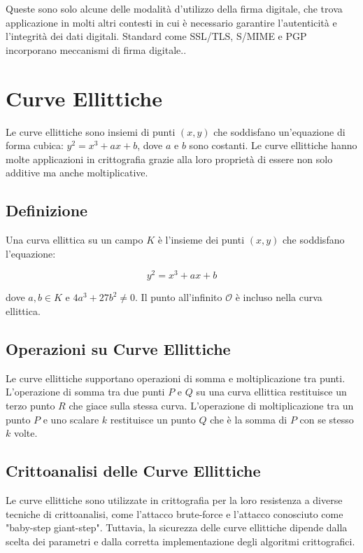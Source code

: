 \documentclass[a4paper,12pt]{report}
\begin{document}
Queste sono solo alcune delle modalità d'utilizzo della firma digitale, che trova applicazione in molti altri contesti in cui è necessario garantire l'autenticità e l'integrità dei dati digitali. Standard come SSL/TLS, S/MIME e PGP incorporano meccanismi di firma digitale..
%
%
%
%
%
%
%
%
%
%
%
%
\chapter{Curve Ellittiche}
Le curve ellittiche sono insiemi di punti $(x, y)$ che soddisfano un'equazione di forma cubica: $y^2 = x^3 + ax + b$, dove $a$ e $b$ sono costanti. Le curve ellittiche hanno molte applicazioni in crittografia grazie alla loro proprietà di essere non solo additive ma anche moltiplicative.

\section{Definizione}

Una curva ellittica su un campo $K$ è l'insieme dei punti $(x, y)$ che soddisfano l'equazione:

\[y^2 = x^3 + ax + b\]

dove $a, b \in K$ e $4a^3 + 27b^2 \neq 0$. Il punto all'infinito $\mathcal{O}$ è incluso nella curva ellittica.

\section{Operazioni su Curve Ellittiche}

Le curve ellittiche supportano operazioni di somma e moltiplicazione tra punti. L'operazione di somma tra due punti $P$ e $Q$ su una curva ellittica restituisce un terzo punto $R$ che giace sulla stessa curva. L'operazione di moltiplicazione tra un punto $P$ e uno scalare $k$ restituisce un punto $Q$ che è la somma di $P$ con se stesso $k$ volte.

\section{Crittoanalisi delle Curve Ellittiche}

Le curve ellittiche sono utilizzate in crittografia per la loro resistenza a diverse tecniche di crittoanalisi, come l'attacco brute-force e l'attacco conosciuto come "baby-step giant-step". Tuttavia, la sicurezza delle curve ellittiche dipende dalla scelta dei parametri e dalla corretta implementazione degli algoritmi crittografici.
\end{document}

